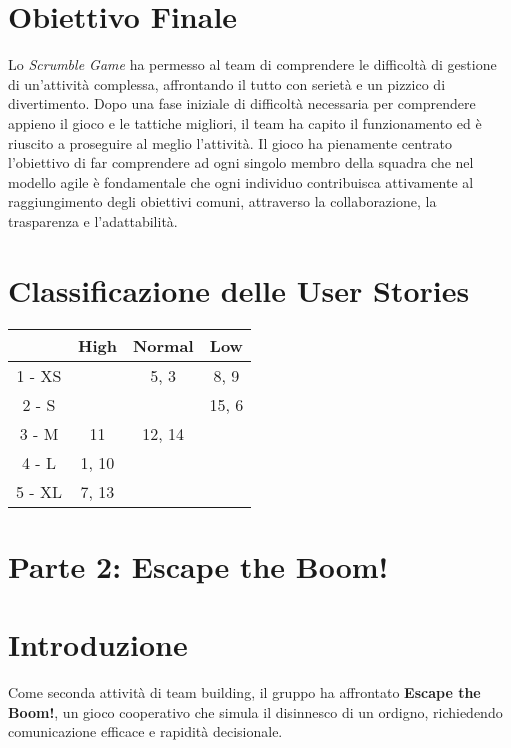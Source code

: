 \documentclass{article}
\begin{document}
\section*{Obiettivo Finale}
Lo \textit{Scrumble Game} ha permesso al team di comprendere le difficoltà di gestione di un'attività complessa, affrontando il tutto con serietà e un pizzico di divertimento. 
Dopo una fase iniziale di difficoltà necessaria per comprendere appieno il gioco e le tattiche migliori, il team ha capito il funzionamento ed è riuscito a proseguire al meglio l'attività.
Il gioco ha pienamente centrato l'obiettivo di far comprendere ad ogni singolo membro della squadra che nel modello agile è fondamentale che ogni individuo contribuisca attivamente al raggiungimento degli obiettivi comuni, attraverso la collaborazione, la trasparenza e l'adattabilità.


\section*{Classificazione delle User Stories}

\begin{tabular}{|c|c|c|c|}
    \hline
    & { \color{red}High} & Normal & {\color{green}Low} \\
    \hline
    \cellcolor{darkgreen}1 - XS & & {5, 3} & {8, 9}\\
    \hline
    \cellcolor{lightgreen}2 - S & & & {15, 6} \\
    \hline
    \cellcolor{yellow}3 - M & {11} & {12, 14} & \\
    \hline
    \cellcolor{pink}4 - L & {1, 10} & & \\
    \hline
    \cellcolor{red}5 - XL & {7, 13} & & \\
    \hline
    \end{tabular}

\section*{Parte 2: Escape the Boom!}

\section*{Introduzione}
Come seconda attività di team building, il gruppo ha affrontato \textbf{Escape the Boom!}, un gioco cooperativo che simula il disinnesco di un ordigno, richiedendo comunicazione efficace e rapidità decisionale.
\end{document}
